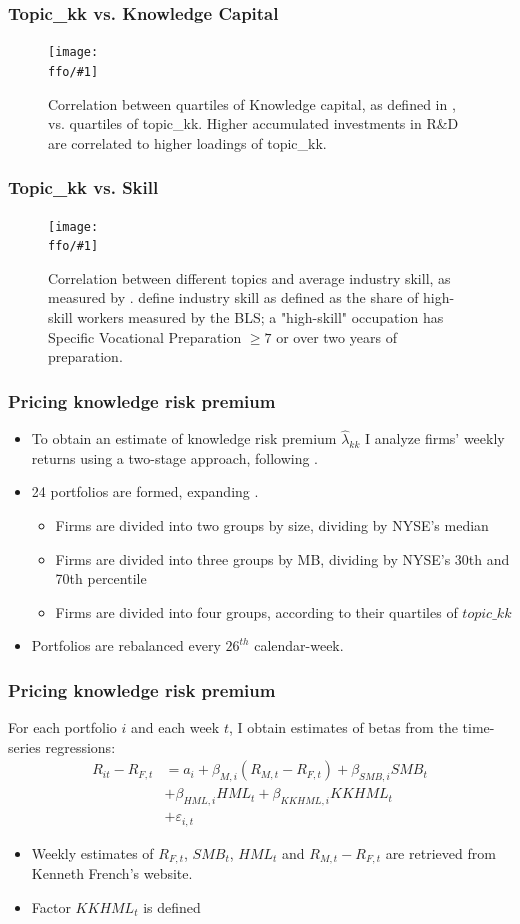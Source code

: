 \documentclass{beamer}
\newcommand{\ffo}{dicfullmc10thr10defnob40noa0_8_4t}
\newcommand{\insertfigure}[2]{
\begin{figure}[h!]
  \centering
  \texttt{[image: \\ffo/\#1]}
  \centering
  \captionsetup{font=scriptsize}
  \caption{#2}
  \label{fig:#1}
\end{figure}
}
\begin{document}
\begin{frame}
\frametitle{Topic\_kk vs. Knowledge Capital}
\scriptsize
\insertfigure{topicvskkpt_hm}{Correlation between quartiles of Knowledge capital,  as defined in \cite{Peters2017-fl}, vs. quartiles of topic\_kk. Higher accumulated investments in R\&D are correlated to higher loadings of topic\_kk.}
\end{frame}

\begin{frame}
\frametitle{Topic\_kk vs. Skill}
\scriptsize
\insertfigure{heatmap}{Correlation between different topics and average industry skill, as measured by \cite{Belo2017-qi}. \cite{Belo2017-qi} define industry skill as defined as the share of high-skill workers measured by the BLS; a "high-skill" occupation has Specific Vocational Preparation $\geq 7$ or over two years of preparation.} 
\end{frame}

\begin{frame}
\small 
\frametitle{Pricing knowledge risk premium}
\begin{itemize}
\item To obtain an estimate of knowledge risk premium $\widehat{\lambda}_{kk}$ I analyze firms' weekly returns using a two-stage approach, following \cite{Goyal2012-ct}. 

\item 24 portfolios are formed, expanding \cite{Fama1993-da}. 
\begin{itemize}
	\item Firms are divided into two groups by size, dividing by NYSE's median
	\item Firms are divided into three groups by MB, dividing by NYSE's 30th and 70th percentile
	\item Firms are divided into four groups, according to their quartiles of $topic\_kk$  
\end{itemize}

\item Portfolios are rebalanced every $26^{th}$ calendar-week.
\end{itemize}
\end{frame}

\begin{frame}
\frametitle{Pricing knowledge risk premium}
For each portfolio $i$ and each week $t$, I obtain estimates of betas from the time-series regressions:
	\begin{align*}
		R_{it}-R_{F,t} &= a_i + \beta_{M, i} (R_{M,t}-R_{F,t}) + \beta_{SMB, i} SMB_t \\
		&+\beta_{HML, i} HML_t +\beta_{KKHML, i} KKHML_t \\
		&+\varepsilon_{i,t} 
	\end{align*}
\begin{itemize}
	\item Weekly estimates of $R_{F,t}$, $SMB_t$, $HML_t$ and $R_{M,t}-R_{F,t}$ are retrieved from Kenneth French's website. 
	\item Factor $KKHML_t$ is defined  
\end{itemize}
\end{frame}
\end{document}
